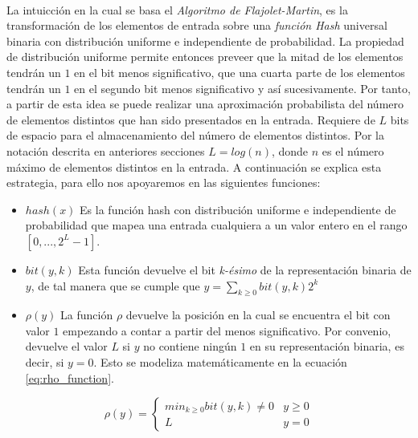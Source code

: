 \documentclass{subfiles}
\begin{document}
      \paragraph{}
      La intuicción en la cual se basa el \emph{Algoritmo de Flajolet-Martin}, es la transformación de los elementos de entrada sobre una \emph{función Hash} universal binaria con distribución uniforme e independiente de probabilidad. La propiedad de distribución uniforme permite entonces preveer que la mitad de los elementos tendrán un $1$ en el bit menos significativo, que una cuarta parte de los elementos tendrán un $1$ en el segundo bit menos significativo y así sucesivamente. Por tanto, a partir de esta idea se puede realizar una aproximación probabilista del número de elementos distintos que han sido presentados en la entrada. Requiere de $L$ bits de espacio para el almacenamiento del número de elementos distintos. Por la notación descrita en anteriores secciones $L = log(n)$, donde $n$ es el número máximo de elementos distintos en la entrada. A continuación se explica esta estrategia, para ello nos apoyaremos en las siguientes funciones:

      \begin{itemize}
        \item $hash(x)$ Es la función hash con distribución uniforme e independiente de probabilidad que mapea una entrada cualquiera a un valor entero en el rango $[0,...,2^L-1]$.
        \item $bit(y, k)$ Esta función devuelve el bit \emph{k-ésimo} de la representación binaria de $y$, de tal manera que se cumple que $y = \sum_{k \geq 0} bit(y,k)2^k$
        \item $\rho(y)$ La función $\rho$ devuelve la posición en la cual se encuentra el bit con valor $1$ empezando a contar a partir del menos significativo. Por convenio, devuelve el valor $L$ si $y$ no contiene ningún $1$ en su representación binaria, es decir, si $y = 0$. Esto se modeliza matemáticamente en la ecuación \eqref{eq:rho_function}.
      \end{itemize}

      \begin{equation}
      \label{eq:rho_function}
        \rho(y) =
          \begin{cases}
            min_{k \geq 0} bit(y, k) \neq 0 & y \geq 0\\
            L & y =0
          \end{cases}
      \end{equation}
\end{document}
